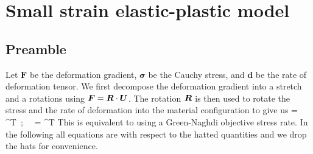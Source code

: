 %
%

\chapter{Small strain elastic-plastic model}
\section{Preamble}
Let $\boldsymbol{F}$ be the deformation gradient, $\boldsymbol{\sigma}$ be the 
Cauchy stress, and $\boldsymbol{d}$ be the rate of deformation tensor.  We
first decompose the deformation gradient into a stretch and a rotations using
$\boldsymbol{F} = \boldsymbol{R}\cdot\boldsymbol{U}$.  The rotation $\boldsymbol{R}$ is then used to rotate the stress and
the rate of deformation into the material configuration to give us
\Beq
  \widehat{\Bsig} = \BR^T\cdot\Bsig\cdot\BR ~;~~
  \widehat{\Bd} = \BR^T\cdot\Bd\cdot\BR 
\Eeq
This is equivalent to using a Green-Naghdi objective stress rate.  In the 
following all equations are with respect to the hatted quantities and we 
drop the hats for convenience.

